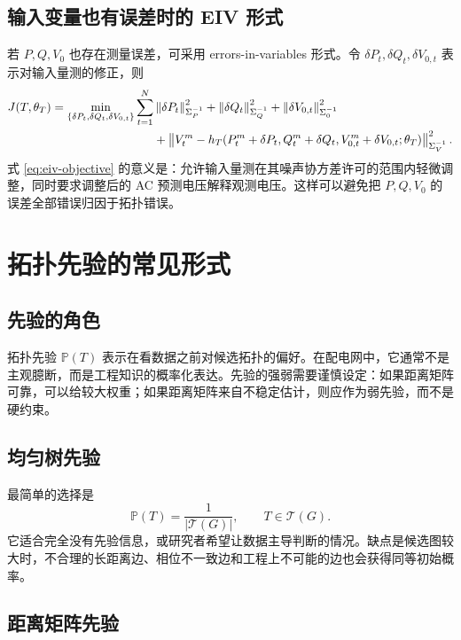 \documentclass[UTF8,12pt,openany]{ctexrep}
\numberwithin{equation}{chapter}
\theoremstyle{definition}
\theoremstyle{plain}
\newcommand{\Prob}{\mathbb{P}}
\newcommand{\norm}[2][]{\left\lVert #2 \right\rVert_{#1}}
\newcommand{\Tcal}{\mathcal{T}}
\begin{document}
\section{输入变量也有误差时的 EIV 形式}

若 $P,Q,V_0$ 也存在测量误差，可采用 errors-in-variables 形式。令 $\delta P_t,\delta Q_t,\delta V_{0,t}$ 表示对输入量测的修正，则
\begin{align}
J(T,\theta_T)
=\min_{\{\delta P_t,\delta Q_t,\delta V_{0,t}\}}
\sum_{t=1}^{N}
&\norm[\Sigma_P^{-1}]{\delta P_t}^2
+\norm[\Sigma_Q^{-1}]{\delta Q_t}^2
+\norm[\Sigma_0^{-1}]{\delta V_{0,t}}^2 \notag\\
&+\norm[\Sigma_V^{-1}]{
V_t^m-h_T(P_t^m+\delta P_t,Q_t^m+\delta Q_t,
V_{0,t}^m+\delta V_{0,t};\theta_T)
}^2 .
\label{eq:eiv-objective}
\end{align}
式 \eqref{eq:eiv-objective} 的意义是：允许输入量测在其噪声协方差许可的范围内轻微调整，同时要求调整后的 AC 预测电压解释观测电压。这样可以避免把 $P,Q,V_0$ 的误差全部错误归因于拓扑错误。

\chapter{拓扑先验的常见形式}

\section{先验的角色}

拓扑先验 $\Prob(T)$ 表示在看数据之前对候选拓扑的偏好。在配电网中，它通常不是主观臆断，而是工程知识的概率化表达。先验的强弱需要谨慎设定：如果距离矩阵可靠，可以给较大权重；如果距离矩阵来自不稳定估计，则应作为弱先验，而不是硬约束。

\section{均匀树先验}

最简单的选择是
\begin{equation}
\Prob(T)=\frac{1}{|\Tcal(G)|},\qquad T\in\Tcal(G).
\label{eq:uniform-tree-prior}
\end{equation}
它适合完全没有先验信息，或研究者希望让数据主导判断的情况。缺点是候选图较大时，不合理的长距离边、相位不一致边和工程上不可能的边也会获得同等初始概率。

\section{距离矩阵先验}
\end{document}
